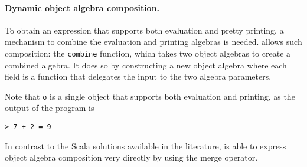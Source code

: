 \paragraph{Dynamic object algebra composition.}
To obtain an expression that supports both evaluation and pretty
printing, a mechanism to combine the evaluation and printing
algebras is needed. \name allows such composition: the \lstinline$combine$
function, which takes two object algebras to create a combined algebra. It
does so by constructing a new object algebra where each field is a
function that delegates the input to the two algebra parameters.
\begin{comment}
  \begin{lstlisting}{language=F2J}
    let combine[A,B](f: ExpAlg[A])(g: ExpAlg[B]) :
    ExpAlg[A&B] = {
      lit = \(x: Int) -> f.lit x ,, g.lit x,
      add = \(x: A & B) (y: A & B) ->
      f.add x y ,, g.add x y
    }
  \end{lstlisting}
\end{comment}

\begin{comment}
  \begin{lstlisting}{language=F2J}
    let newAlg =
    combine[IEval,IPrint] subEvalAlg printAlg;
    let o = e1[IEval&IPrint] newAlg;
    o.print ++ " = " ++ o.eval.toString()
  \end{lstlisting}
\end{comment}


Note that \lstinline$o$ is a single object that supports both
evaluation and printing, as the output of the program is
\begin{lstlisting}
> 7 + 2 = 9
\end{lstlisting}

In contrast to the Scala solutions available in the
literature, \name is able to express object algebra
composition very directly by using the merge operator.
